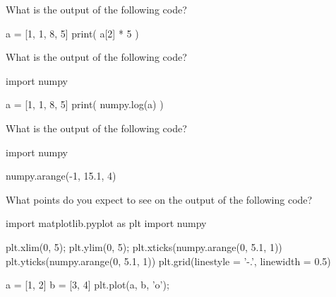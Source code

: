\documentclass[../main.tex]{subfiles}
\begin{document}
\begin{example}
  What is the output of the following code?

  \begin{pythoncode}
a = [1, 1, 8, 5]
print( a[2] * 5 )
  \end{pythoncode}
\end{example}


\begin{example}
  What is the output of the following code?
  \begin{pythoncode}
import numpy

a = [1, 1, 8, 5]
print( numpy.log(a) )
  \end{pythoncode}
\end{example}

\begin{example}
  What is the output of the following code?

  \begin{pythoncode}
import numpy

numpy.arange(-1, 15.1, 4)
  \end{pythoncode}
\end{example}

\begin{example}
  What points do you expect to see on the output of the following code?

  \begin{pythoncode}
import matplotlib.pyplot as plt
import numpy

plt.xlim(0, 5);
plt.ylim(0, 5);
plt.xticks(numpy.arange(0, 5.1, 1))
plt.yticks(numpy.arange(0, 5.1, 1))
plt.grid(linestyle = '-.', linewidth = 0.5)

a = [1, 2]
b = [3, 4]
plt.plot(a, b, 'o');
  \end{pythoncode}
\end{example}
\end{document}
